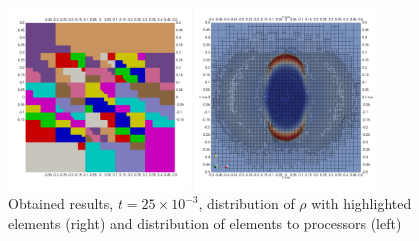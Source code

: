 \begin{figure}[H]
	\begin{center}
		\includegraphics[width=0.87\textwidth]{img/mhd-blast/old/mya6.jpg}
	\caption{Obtained results, $t = 25\times 10^{-3}$, distribution of $\rho$ with highlighted elements (right) and distribution of elements to processors (left)}
	\label{figure:blastOldMyAdapt6}
	\end{center}
\end{figure}
\vspace{-8mm}

